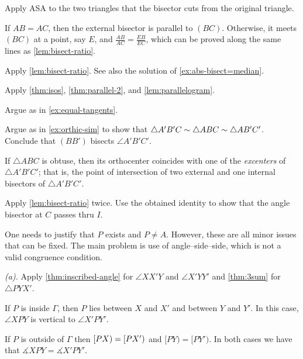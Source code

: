 Apply ASA to the two triangles that the bisector cuts from the original triangle. 

If $AB=AC$, then the external bisector is parallel to $(BC)$.
Otherwise, it meets $(BC)$ at a point, say $E$, and
$\frac{AB}{AC}=\frac{EB}{EC}$, which can be proved along the same lines as \ref{lem:bisect-ratio}.

Apply \ref{lem:bisect-ratio}.
See also the solution of \ref{ex:abs-bisect=median}.

Apply \ref{thm:isos}, \ref{thm:parallel-2}, and \ref{lem:parallelogram}.

Argue as in \ref{ex:equal-tangents}.

Argue as in \ref{ex:orthic-sim} to show that $\triangle A'B'C\z\sim \triangle ABC\z\sim\triangle AB'C'$.
Conclude that $(BB')$ bisects $\angle A'B'C'$.

If $\triangle ABC$ is obtuse, then its orthocenter coincides with one of the \emph{excenters} of $\triangle A'B'C'$;
that is, 
the point of intersection of two external and one internal bisectors of $\triangle A'B'C'$.

Apply \ref{lem:bisect-ratio} twice.
Use the obtained identity to show that the angle bisector at $C$ passes thru $I$.

One needs to justify that $P$ exists and $P\ne A$.
However, these are all minor issues that can be fixed.
The main problem is use of angle–side–side, which is not a valid congruence condition.

\setcounter{eqtn}{0}

 \textit{(a).}
Apply \ref{thm:inscribed-angle} for $\angle XX'Y$ and $\angle X'YY'$
and \ref{thm:3sum} for $\triangle PYX'$.

 If $P$ is inside $\Gamma$, then $P$ lies between $X$ and $X'$ and between $Y$ and $Y'$.
In this case, $\angle XPY$ is vertical to $\angle X'PY'$.

If $P$ is outside of $\Gamma$ then $[PX)\z=[PX')$ and $[PY)=[PY')$.
In both cases we have that $\measuredangle XPY=\measuredangle X'PY'$.

